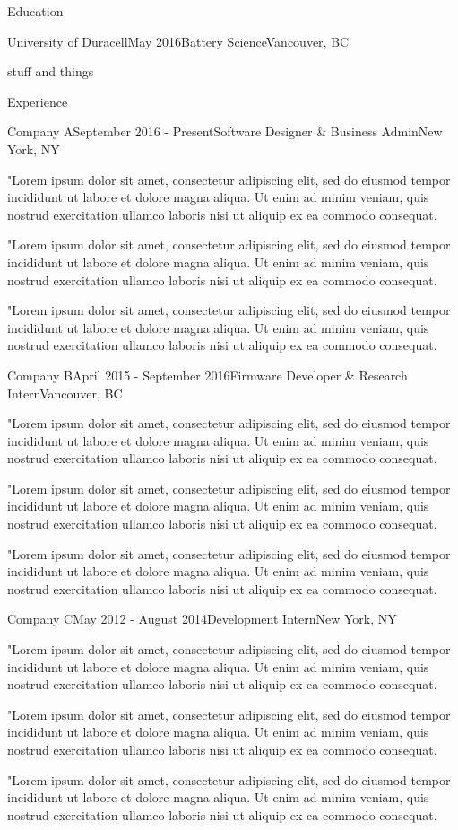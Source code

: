 \documentclass{resume} %
\newcommand{\dummyJob}{
	\item "Lorem ipsum dolor sit amet, consectetur adipiscing elit, sed do eiusmod tempor incididunt ut labore et dolore magna aliqua. Ut enim ad minim veniam, quis nostrud exercitation ullamco laboris nisi ut aliquip ex ea commodo consequat.
	\item "Lorem ipsum dolor sit amet, consectetur adipiscing elit, sed do eiusmod tempor incididunt ut labore et dolore magna aliqua. Ut enim ad minim veniam, quis nostrud exercitation ullamco laboris nisi ut aliquip ex ea commodo consequat.
	\item "Lorem ipsum dolor sit amet, consectetur adipiscing elit, sed do eiusmod tempor incididunt ut labore et dolore magna aliqua. Ut enim ad minim veniam, quis nostrud exercitation ullamco laboris nisi ut aliquip ex ea commodo consequat.
}
\begin{document}
\begin{rSection}{Education}
\begin{rSubsection}{University of Duracell}{May 2016}{Battery Science}{Vancouver, BC}
\item
\end{rSubsection}
\vspace{-1cm}
stuff and things\\
\vspace{-.6cm}
\end{rSection}

\vspace{-.2cm}

\begin{rSection}{Experience}
\begin{rSubsection}{Company A}{September 2016 - Present}{Software Designer \& Business Admin}{New York, NY}
\dummyJob
\end{rSubsection}
\vspace{-.3cm}


\begin{rSubsection}{Company B}{April 2015 - September 2016}{Firmware Developer \& Research Intern}{Vancouver, BC}
\dummyJob
\end{rSubsection}
\vspace{-.3cm}


\begin{rSubsection}{Company C}{May 2012 - August 2014}{Development Intern}{New York, NY}
\dummyJob
\end{rSubsection}
\vspace{-.3cm}

\end{rSection}
\vspace{-.2cm}

\end{document}
